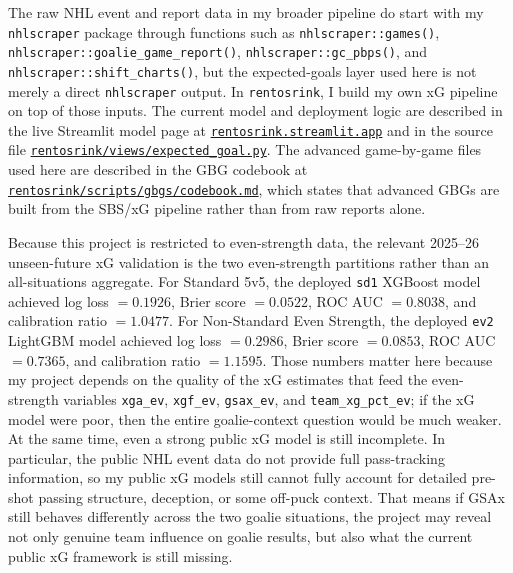 \documentclass[
  10pt,
]{extarticle}
\begin{document}
The raw NHL event and report data in my broader pipeline do start with my \texttt{nhlscraper} package through functions such as \texttt{nhlscraper::games()}, \texttt{nhlscraper::goalie\_game\_report()}, \texttt{nhlscraper::gc\_pbps()}, and \texttt{nhlscraper::shift\_charts()}, but the expected-goals layer used here is not merely a direct \texttt{nhlscraper} output. In \texttt{rentosrink}, I build my own xG pipeline on top of those inputs. The current model and deployment logic are described in the live Streamlit model page at \href{https://rentosrink.streamlit.app/expected_goal}{\texttt{rentosrink.streamlit.app}} and in the source file \href{https://github.com/RentoSaijo/rentosrink/blob/main/views/expected_goal.py}{\texttt{rentosrink/views/expected\_goal.py}}. The advanced game-by-game files used here are described in the GBG codebook at \href{https://github.com/RentoSaijo/rentosrink/blob/main/scripts/gbgs/codebook.md}{\texttt{rentosrink/scripts/gbgs/codebook.md}}, which states that advanced GBGs are built from the SBS/xG pipeline rather than from raw reports alone.

Because this project is restricted to even-strength data, the relevant 2025--26 unseen-future xG validation is the two even-strength partitions rather than an all-situations aggregate. For Standard 5v5, the deployed \texttt{sd1} XGBoost model achieved log loss \(= 0.1926\), Brier score \(= 0.0522\), ROC AUC \(= 0.8038\), and calibration ratio \(= 1.0477\). For Non-Standard Even Strength, the deployed \texttt{ev2} LightGBM model achieved log loss \(= 0.2986\), Brier score \(= 0.0853\), ROC AUC \(= 0.7365\), and calibration ratio \(= 1.1595\). Those numbers matter here because my project depends on the quality of the xG estimates that feed the even-strength variables \texttt{xga\_ev}, \texttt{xgf\_ev}, \texttt{gsax\_ev}, and \texttt{team\_xg\_pct\_ev}; if the xG model were poor, then the entire goalie-context question would be much weaker. At the same time, even a strong public xG model is still incomplete. In particular, the public NHL event data do not provide full pass-tracking information, so my public xG models still cannot fully account for detailed pre-shot passing structure, deception, or some off-puck context. That means if GSAx still behaves differently across the two goalie situations, the project may reveal not only genuine team influence on goalie results, but also what the current public xG framework is still missing.
\end{document}
